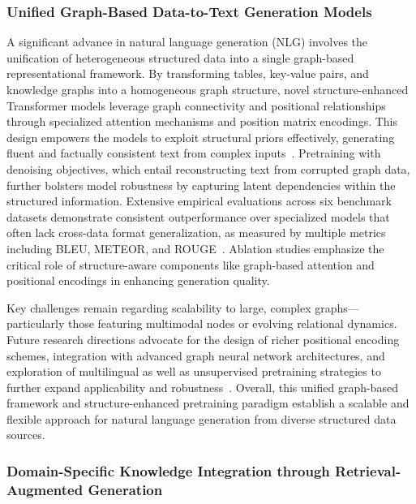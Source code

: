 \documentclass[sigconf]{acmart}
\begin{document}
\subsubsection{Unified Graph-Based Data-to-Text Generation Models}

A significant advance in natural language generation (NLG) involves the unification of heterogeneous structured data into a single graph-based representational framework. By transforming tables, key-value pairs, and knowledge graphs into a homogeneous graph structure, novel structure-enhanced Transformer models leverage graph connectivity and positional relationships through specialized attention mechanisms and position matrix encodings. This design empowers the models to exploit structural priors effectively, generating fluent and factually consistent text from complex inputs~\cite{ref46}. Pretraining with denoising objectives, which entail reconstructing text from corrupted graph data, further bolsters model robustness by capturing latent dependencies within the structured information. Extensive empirical evaluations across six benchmark datasets demonstrate consistent outperformance over specialized models that often lack cross-data format generalization, as measured by multiple metrics including BLEU, METEOR, and ROUGE~\cite{ref46}. Ablation studies emphasize the critical role of structure-aware components like graph-based attention and positional encodings in enhancing generation quality.

Key challenges remain regarding scalability to large, complex graphs—particularly those featuring multimodal nodes or evolving relational dynamics. Future research directions advocate for the design of richer positional encoding schemes, integration with advanced graph neural network architectures, and exploration of multilingual as well as unsupervised pretraining strategies to further expand applicability and robustness~\cite{ref46}. Overall, this unified graph-based framework and structure-enhanced pretraining paradigm establish a scalable and flexible approach for natural language generation from diverse structured data sources.

\subsubsection{Domain-Specific Knowledge Integration through Retrieval-Augmented Generation}
\end{document}
